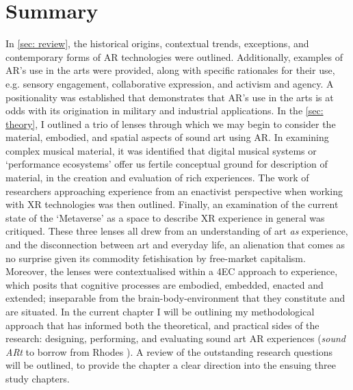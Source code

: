 \section{Summary}\label{sec: method-summary}
In \autoref{sec: review}, the historical origins, contextual trends, exceptions, and contemporary forms of AR technologies were outlined. Additionally, examples of AR's use in the arts were provided, along with specific rationales for their use, e.g. sensory engagement, collaborative expression, and activism and agency. A positionality was established that demonstrates that AR's use in the arts is at odds with its origination in military and industrial applications. In the \autoref{sec: theory}, I outlined a trio of lenses through which we may begin to consider the material, embodied, and spatial aspects of sound art using AR. In examining complex musical material, it was identified that digital musical systems or `performance ecosystems' offer us fertile conceptual ground for description of material, in the creation and evaluation of rich experiences. The work of researchers approaching experience from an enactivist perspective when working with XR technologies was then outlined. Finally, an examination of the current state of the `Metaverse' as a space to describe XR experience in general was critiqued. These three lenses all drew from an understanding of art \textit{as} experience, and the disconnection between art and everyday life, an alienation that comes as no surprise given its commodity fetishisation by free-market capitalism. Moreover, the lenses were contextualised within a 4EC approach to experience, which posits that cognitive processes are embodied, embedded, enacted and extended; inseparable from the brain-body-environment that they constitute and are situated. In the current chapter I will be outlining my methodological approach that has informed both the theoretical, and practical sides of the research: designing, performing, and evaluating sound art AR experiences (\textit{sound ARt} to borrow from Rhodes \citeyearpar{rhodes2018}). A review of the outstanding research questions will be outlined, to provide the chapter a clear direction into the ensuing three study chapters.

\begin{enumerate}
    \RQmedium
    \RQexperience
\end{enumerate}


